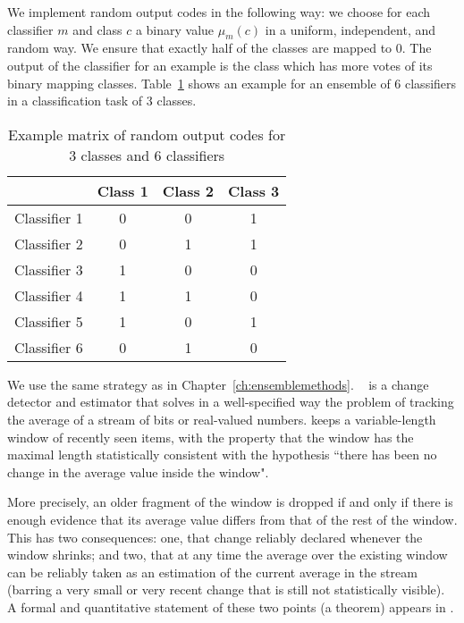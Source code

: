 We implement random output codes in the following way: we choose for each classifier $m$ and class $c$ a binary value $\mu_m(c)$ in a uniform, independent, and random way. We ensure that exactly half of the classes are mapped to $0$. The output of the classifier for an example is the class which has more votes of its binary mapping classes. Table~\ref{tab:codes} shows an example for an ensemble of 6 classifiers in a classification task of 3 classes. 
 
 \begin{table}[h]
\caption{Example matrix of random output codes for 3 classes and 6 classifiers}
 \begin{center}
  \begin{tabular}{| l | c | c | c | }
    \hline
     &  Class 1 & Class 2 & Class 3  \\ \hline
   Classifier 1 & 0 & 0 & 1  \\ 
   Classifier 2 & 0 & 1 & 1  \\ 
   Classifier 3 & 1 & 0 & 0  \\
   Classifier 4 & 1 & 1 & 0  \\
   Classifier 5 & 1 & 0 & 1  \\
   Classifier 6 & 0 & 1 & 0  \\
    \hline
  \end{tabular}
\end{center}
\label{tab:codes}
\end{table}%

 
We use the same strategy as in Chapter~\ref{ch:ensemblemethods}.
\adwinb~\cite{bif-gav} is a change detector and estimator that solves in a 
well-specified way the problem of tracking the average of a stream of bits or 
real-valued numbers. \adwin keeps a variable-length window of recently seen 
items, with the property that the window has the maximal length statistically 
consistent with the hypothesis ``there has been no change in the average value
inside the window". 

\BEGINOMIT
More precisely, an older fragment of the window is dropped if and only if 
there is enough evidence that its average value differs from that of 
the rest of the window. 
This has two consequences: one, that change reliably declared whenever
the window shrinks; and two, that at any time the average over the existing
window can be reliably taken as an estimation of the current average in the stream
(barring a very small or very recent change that is still not statistically 
visible). A formal and quantitative statement of these two points (a theorem)
appears in \cite{bif-gav}. 
\ENDOMIT

